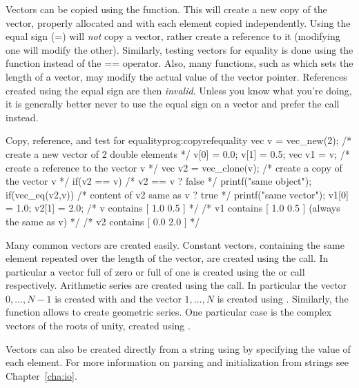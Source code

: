     Vectors can be copied using the 
  function. This will create a new copy of the vector, properly
  allocated and with each element copied independently. Using the
  equal sign (=) will \emph{not} copy a vector, rather create a
  reference to it (modifying one will modify the other). Similarly,
  testing vectors for equality is done using the 
  function instead of the == operator.  Also, many functions, such as
   which sets the length of a vector, may
  modify the actual value of the vector pointer. References created
  using the equal sign are then \emph{invalid}. Unless you know what
  you're doing, it is generally better never to use the equal sign on
  a vector and prefer the  call instead. 

\begin{program}{Copy, reference, and test for equality}{prog:copyrefequality}
vec v = vec_new(2);   /* create a new vector of 2 double elements */
v[0] = 0.0;
v[1] = 0.5;
vec v1 = v;            /* create a reference to the vector v */
vec v2 = vec_clone(v); /* create a copy of the vector v */
if(v2 == v)            /* v2 == v ? false */
  printf("same object\n");  
if(vec_eq(v2,v))       /* content of v2 same as v ? true */
  printf("same vector\n");  
v1[0] = 1.0;
v2[1] = 2.0;
/* v contains [ 1.0 0.5 ] */
/* v1 contains [ 1.0 0.5 ] (always the same as v) */
/* v2 contains [ 0.0 2.0 ] */
\end{program}

    Many common vectors are created easily. Constant vectors,
  containing the same element repeated over the length of the vector,
  are created using the  call. In particular
  a vector full of zero or full of one is created using the
   or  call
  respectively. Arithmetic series are created using the 
 call. In
  particular the vector $0,\dotsc,N-1$ is created with
   and the vector $1,\dotsc,N$ is created
  using . Similarly, the 
 function allows to create geometric series. One particular case is the complex vectors
  of the roots of unity, created using .

    Vectors can also be created directly from a string using
     by specifying the value of
    each element. For more information on parsing and initialization
    from strings see Chapter~\ref{cha:io}. 

